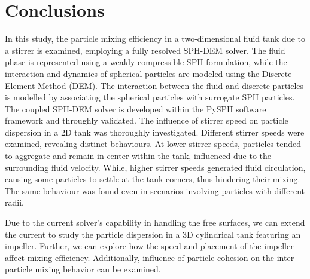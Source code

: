 \documentclass[preprint,12pt]{elsarticle}
\begin{document}



\FloatBarrier%
\section{Conclusions}
\label{sec:conclusions}
In this study, the particle mixing efficiency in a two-dimensional fluid tank
due to a stirrer is examined, employing a fully resolved SPH-DEM solver. The
fluid phase is represented using a weakly compressible SPH formulation, while
the interaction and dynamics of spherical particles are modeled using the
Discrete Element Method (DEM). The interaction between the fluid and discrete
particles is modelled by associating the spherical particles with surrogate
SPH particles. The coupled SPH-DEM solver is developed within the PySPH
software framework \cite{ramachandran2021pysph} and throughly validated.  The
influence of stirrer speed on particle dispersion in a 2D tank was thoroughly
investigated. Different stirrer speeds were examined, revealing distinct
behaviours. At lower stirrer speeds, particles tended to aggregate and remain
in center within the tank, influenced due to the surrounding fluid
velocity. While, higher stirrer speeds generated fluid circulation, causing
some particles to settle at the tank corners, thus hindering their mixing. The
same behaviour was found even in scenarios involving particles with different
radii.


Due to the current solver's capability in handling the free surfaces, we can
extend the current to study the particle dispersion in a 3D cylindrical tank
featuring an impeller. Further, we can explore how the speed and placement of
the impeller affect mixing efficiency. Additionally, influence of particle
cohesion on the inter-particle mixing behavior can be examined.





\end{document}
